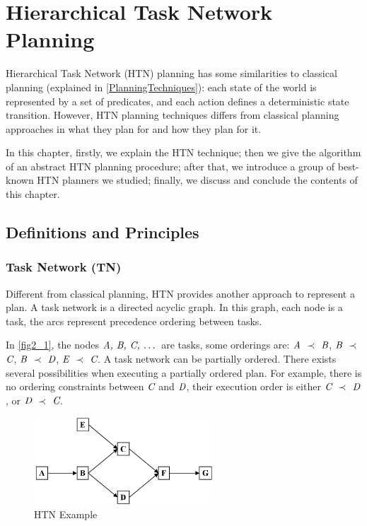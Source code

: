 \chapter{Hierarchical Task Network Planning}
\label{chapter2}

Hierarchical Task Network (HTN) planning has some similarities to classical planning (explained in \autoref{PlanningTechniques}): each state of the world is represented by a set of predicates, and each action defines a deterministic state transition. However, HTN planning techniques differs from classical planning approaches in what they plan for and how they plan for it.

In this chapter, firstly, we explain the HTN technique; then we give the algorithm of an abstract HTN planning procedure; after that, we introduce a group of best-known HTN planners we studied; finally, we discuss and conclude the contents of this chapter.

\section{Definitions and Principles}
\subsection{Task Network (TN)}
Different from classical planning, HTN provides another approach to represent a plan. A task network is a directed acyclic graph. In this graph, each node is a task, the arcs represent precedence ordering between tasks. 

In \autoref{fig2_1}, the nodes $\emph{A, B, C, \ldots}$ are tasks, some orderings are: $\emph{A}$ $\prec$ $\emph{B}$, $\emph{B}$ $\prec$ $\emph{C}$, $\emph{B}$ $\prec$ $\emph{D}$, $\emph{E}$ $\prec$ $\emph{C}$. A task network can be partially ordered. There exists several possibilities when executing a partially ordered plan. For example, there is no ordering constraints between $\emph{C}$ and $\emph{D}$, their execution order is either $\emph{C}$ $\prec$ $\emph{D}$, or $\emph{D}$ $\prec$ $\emph{C}$.%

\begin{figure}[H]
    \center
    \includegraphics[width=0.6\textwidth]{./images/2_1.png}
    \caption{HTN Example}
    \label{fig2_1}
\end{figure}

